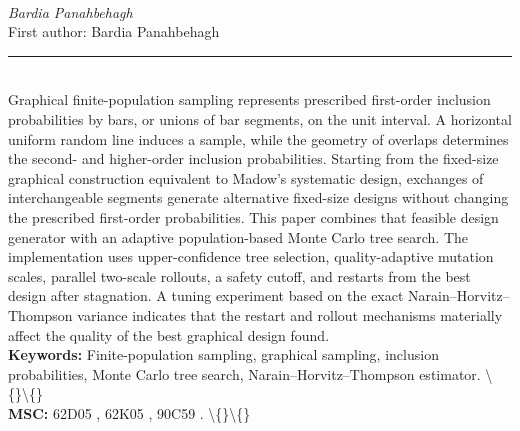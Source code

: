 \documentclass[10pt,twoside]{article}
\begin{document}
\noindent\begin{minipage}[t][\textheight]{\textwidth}
\\[0.35em]
{\itshape Bardia Panahbehagh}\\[0.2em]
{\footnotesize First author: Bardia Panahbehagh}\\[0.45em]
\noindent\rule{\textwidth}{0.3pt}\\[0.4em]
{\footnotesize  Graphical finite-population sampling represents prescribed first-order inclusion probabilities by bars, or unions of bar segments, on the unit interval. A horizontal uniform random line induces a sample, while the geometry of overlaps determines the second- and higher-order inclusion probabilities. Starting from the fixed-size graphical construction equivalent to Madow's systematic design, exchanges of interchangeable segments generate alternative fixed-size designs without changing the prescribed first-order probabilities. This paper combines that feasible design generator with an adaptive population-based Monte Carlo tree search. The implementation uses upper-confidence tree selection, quality-adaptive mutation scales, parallel two-scale rollouts, a safety cutoff, and restarts from the best design after stagnation. A tuning experiment based on the exact Narain--Horvitz--Thompson variance indicates that the restart and rollout mechanisms materially affect the quality of the best graphical design found.}\\[0.4em]
{\footnotesize\bfseries Keywords:} {\footnotesize Finite-population sampling, graphical sampling, inclusion probabilities, Monte Carlo tree search, Narain--Horvitz--Thompson estimator. \textbackslash\{\}\textbackslash\{\}}\\[0.15em]
{\footnotesize\bfseries MSC:} {\footnotesize 62D05 , 62K05 , 90C59 . \textbackslash\{\}\textbackslash\{\}}\\
\vfill
\end{minipage}
\newpage
\end{document}

